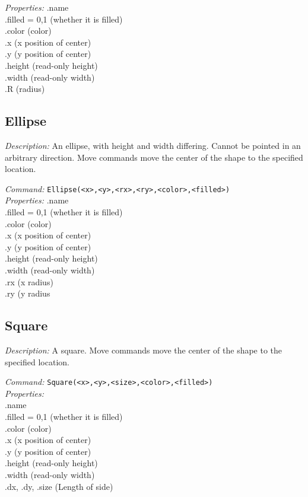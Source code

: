 \emph{Properties:}
.name\\
.filled = {0,1} (whether it is filled)\\
.color (color) \\
.x  (x position of center) \\
.y  (y position of center)\\
.height (read-only height)\\
.width (read-only width)\\
.R  (radius)\\

\subsection{Ellipse}

\emph{Description:} An ellipse, with height and width differing.
  Cannot be pointed in an arbitrary direction.  Move commands move the center
  of the shape to the specified location.

\emph{Command:}  \verb+Ellipse(<x>,<y>,<rx>,<ry>,<color>,<filled>)+\\

\emph{Properties:}
.name\\
.filled = {0,1} (whether it is filled)\\
.color (color) \\
.x  (x position of center) \\
.y  (y position of center)\\
.height (read-only height)\\
.width (read-only width)\\
.rx  (x radius)\\
.ry  (y radius


\subsection{Square}

\emph{Description:} A square. Move commands move the center
  of the shape to the specified location.

\emph{Command:}  \verb+Square(<x>,<y>,<size>,<color>,<filled>)+\\

\emph{Properties:}\\
.name\\
.filled = 0,1 (whether it is filled)\\
.color (color) \\
.x  (x position of center) \\
.y  (y position of center)\\
.height (read-only height)\\
.width (read-only width)\\
.dx, .dy, .size  (Length of side)\\



